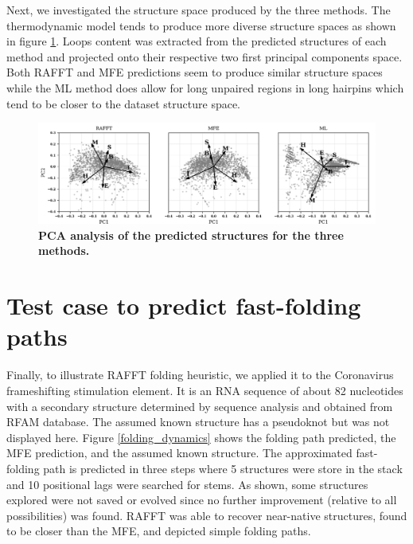 \documentclass[a4paper,12pt]{article}
\begin{document}
{{Next, we investigated the structure space produced by the three methods. The
thermodynamic model tends to produce more diverse structure spaces as shown in
figure \ref{pred_struct_space}. Loops content was extracted from the predicted
structures of each method and projected onto their respective two first
principal components space. Both RAFFT and MFE predictions seem to produce
similar structure spaces while the ML method does allow for long unpaired
regions in long hairpins which tend to be closer to the dataset structure space.

\begin{figure}[htbp]
\centering
\includegraphics[width=.9\linewidth]{img/pca_predicted.png}
\caption{\label{pred_struct_space}\textbf{PCA analysis of the predicted structures for the three methods.}}
\end{figure}

\clearpage
\section{Test case to predict fast-folding paths}
\label{sec:orgadc1fa5}
Finally, to illustrate RAFFT folding heuristic, we applied it to the Coronavirus
frameshifting stimulation element. It is an RNA sequence of about 82 nucleotides
with a secondary structure determined by sequence analysis and obtained from
RFAM database. The assumed known structure has a pseudoknot but was not
displayed here. Figure \ref{folding_dynamics} shows the folding path predicted,
the MFE prediction, and the assumed known structure. The approximated
fast-folding path is predicted in three steps where 5 structures were store in
the stack and 10 positional lags were searched for stems. As shown, some
structures explored were not saved or evolved since no further improvement
(relative to all possibilities) was found. RAFFT was able to recover near-native
structures, found to be closer than the MFE, and depicted simple folding paths.

}}
\end{document}
